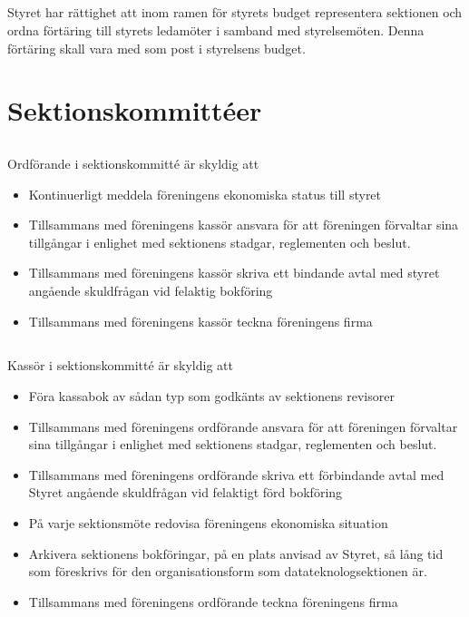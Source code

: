 \documentclass{dtek}
\begin{document}
\subsection{}
Styret har rättighet att inom ramen för styrets budget representera sektionen och ordna förtäring till styrets ledamöter i samband med styrelsemöten. Denna förtäring skall vara med som post i styrelsens budget.

\section{Sektionskommittéer}
\label{sec:sektionsforeningar}
\subsection{}
Ordförande i sektionskommitté är skyldig att
\begin{itemize}
\item Kontinuerligt meddela föreningens ekonomiska status till styret
\item Tillsammans med föreningens kassör ansvara för att föreningen förvaltar sina tillgångar i enlighet med sektionens stadgar, reglementen och beslut.
\item Tillsammans med föreningens kassör skriva ett bindande avtal med
styret angående skuldfrågan vid felaktig bokföring
\item Tillsammans med föreningens kassör teckna föreningens firma
\end{itemize}
\subsection{}
Kassör i sektionskommitté är skyldig att
\begin{itemize}
\item Föra kassabok av sådan typ som godkänts av sektionens revisorer
\item Tillsammans med föreningens ordförande ansvara för att föreningen förvaltar sina tillgångar i enlighet med sektionens stadgar, reglementen och beslut.
\item Tillsammans med föreningens ordförande skriva ett förbindande avtal med Styret angående skuldfrågan vid felaktigt förd bokföring
\item På varje sektionsmöte redovisa föreningens ekonomiska situation
\item Arkivera sektionens bokföringar, på en plats anvisad av Styret, så lång tid som föreskrivs för den organisationsform som datateknologsektionen är.
\item Tillsammans med föreningens ordförande teckna föreningens firma
\end{itemize}
\end{document}
